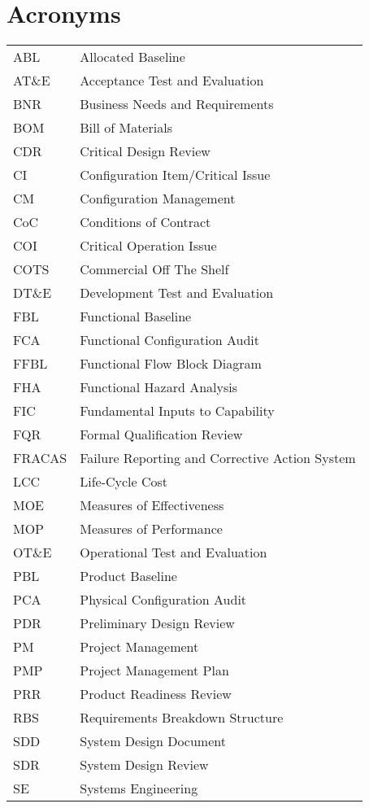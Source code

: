 \documentclass[journal]{IEEEtran}
\begin{document}
\section{Acronyms}
\begin{tabular}{ l l }
ABL & Allocated Baseline \\ 
AT\&E & Acceptance Test and Evaluation \\
BNR & Business Needs and Requirements \\
BOM & Bill of Materials \\
CDR & Critical Design Review \\
CI & Configuration Item/Critical Issue \\
CM & Configuration Management \\
CoC & Conditions of Contract \\
COI & Critical Operation Issue \\
COTS & Commercial Off The Shelf \\
DT\&E & Development Test and Evaluation \\
FBL & Functional Baseline \\
FCA & Functional Configuration Audit \\
FFBL & Functional Flow Block Diagram \\
FHA & Functional Hazard Analysis \\
FIC & Fundamental Inputs to Capability \\
FQR & Formal Qualification Review \\
FRACAS & Failure Reporting and Corrective Action System \\
LCC & Life-Cycle Cost \\
MOE & Measures of Effectiveness \\
MOP & Measures of Performance \\
OT\&E & Operational Test and Evaluation \\
PBL & Product Baseline \\
PCA & Physical Configuration Audit \\
PDR & Preliminary Design Review \\
PM & Project Management \\
PMP & Project Management Plan \\
PRR & Product Readiness Review \\
RBS & Requirements Breakdown Structure \\
SDD & System Design Document \\
SDR & System Design Review \\
SE & Systems Engineering \\

\end{tabular}
\end{document}
